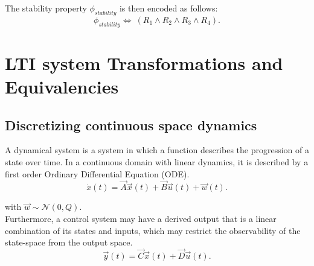 \documentclass[runningheads,a4paper]{llncs}
\begin{document}
The stability property $\phi_{stability}$ is then encoded as follows:
$$
\phi_{stability}\iff \ (R_{1} \wedge R_{2} \wedge R_{3} \wedge R_{4}).
$$


\section{LTI system Transformations and Equivalencies} \label{sec:appendix}

\subsection{Discretizing continuous space dynamics}

A dynamical system is a system in which a function describes the progression of a state over time. 
In a continuous domain with linear dynamics, it is described by a first order Ordinary Differential Equation (ODE).
\begin{equation}
\dot{x}(t)=\vec{A}\vec{x}(t)+\vec{B}\vec{u}(t) +\vec{w}(t).
\label{eq:dynamical}
\end{equation}

\noindent with $\vec{w} \sim \mathcal{N}(0,Q)$.\\
Furthermore, a control system may have a derived output that is a linear combination of its states and inputs, 
which may restrict the observability of the state-space from the output space.
\begin{equation}
\vec{y}(t)=\vec{C}\vec{x}(t)+\vec{D}\vec{u}(t).
\end{equation}
\end{document}
